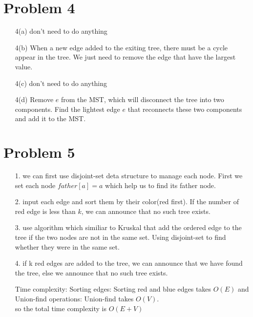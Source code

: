 \documentclass[12pt,letterpaper]{article}
\begin{document}
\section{Problem 4}
    \begin{itemize}
        \item [4(a)] don't need to do anything
        \item [4(b)] When a new edge added to the exiting tree, there must be a cycle appear in the tree. We just need to remove the edge that have the largest value.
        \item [4(c)] don't need to do anything
        \item [4(d)] Remove $e$ from the MST, which will disconnect the tree into two components. Find the lightest edge $e$ that reconnects these two components and add it to the MST.\\ 
    \end{itemize}
\section{Problem 5}
    \begin{itemize}
        \item [1.]we can first use disjoint-set deta structure to manage each node. First we set each node $father[a]=a$ which help us to find its father node.\\
        \item [2.]input each edge and sort them by their color(red first). If the number of red edge is less than $k$, we can announce that no such tree exists.\\
        \item [3.]use algorithm which similiar to Kruskal that add the ordered edge to the tree if the two nodes are not in the same set. Using disjoint-set to find whether they were in the same set.\\ 
        \item [4.]if k red edges are added to the tree, we can announce that we have found the tree, else we announce that no such tree exists.\\ 
        \item [Time complexity:] Sorting edges: Sorting red and blue edges takes $O(E)$ and Union-find operations: Union-find takes $O(V)$.\\
        so the total time complexity is $O(E+V)$ 
    \end{itemize}
\end{document}
